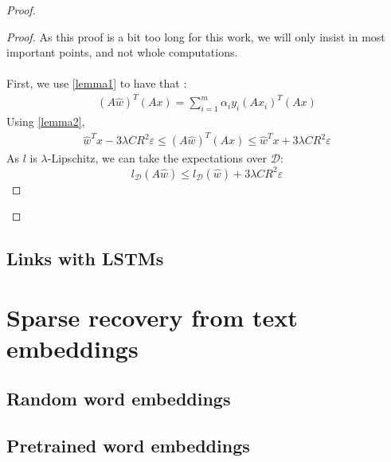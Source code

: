 \documentclass{article}
\begin{document}
\begin{proof}
\begin{proof}
        As this proof is a bit too long for this work, we will only insist in 
        most important points, and not whole computations. \\ \\
        First, we use \ref{lemma1} to have that :
        \begin{align*}
            (A\hat{w})^T(Ax)  = \sum_{i=1}^m \alpha_i y_i (A x_i)^T(Ax)
        \end{align*}
        Using \ref{lemma2}, 
        \begin{align*}
            \hat{w}^Tx - 3\lambda CR^2\varepsilon 
            \leq (A\hat{w})^T(Ax) 
            \leq \hat{w}^Tx + 3\lambda CR^2\varepsilon 
        \end{align*}
        As $l$ is $\lambda$-Lipschitz, we can take the expectations over $\mathcal{D}$:
        \[ l_{\mathcal{D}}(A \hat{w}) \leq l_{\mathcal{D}}(\hat{w}) +  3\lambda CR^2\varepsilon  \]
    \end{proof}
\end{proof}


\subsection{Links with LSTMs}



\section{Sparse recovery from text embeddings}

\subsection{Random word embeddings}

\subsection{Pretrained word embeddings}












 

\end{document}
